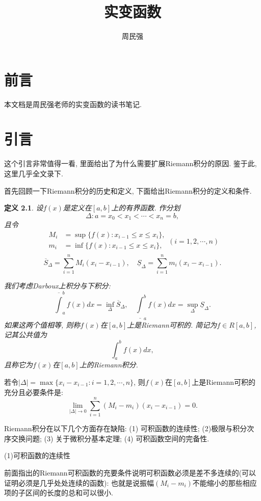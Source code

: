 \documentclass[12pt,a4paper,openany]{book}
\title{实变函数}
\author{周民强}
\newtheorem{definition}{定义}[section]
\begin{document}
\frontmatter
\frontmatter
\begin{titlepage}
\maketitle
\end{titlepage}
\setcounter{page}{0}
\chapter{前言}
本文档是周民强老师的实变函数的读书笔记.

\chapter{引言}
这个引言非常值得一看, 里面给出了为什么需要扩展Riemann积分的原因. 鉴于此, 这里几乎全文录下.

首先回顾一下Riemann积分的历史和定义, 下面给出Riemann积分的定义和条件.

\begin{definition}
设$f(x)$是定义在$[a, b]$上的有界函数. 作分划
$$
\Delta: a = x_0 < x_1 < \cdots < x_n = b,
$$
且令
$$
\left.
\begin{aligned}
M_i &= \sup\{f(x) : x_{i-1} \le x \le x_i \}, \\
m_i &= \inf\{f(x) : x_{i-1} \le x \le x_i \}, \\
\end{aligned}
\right.
(i=1,2,\cdots, n)
$$
$$
\overline{S}_{\Delta} = \sum_{i=1}^{n}{M_i(x_i - x_{i-1})}, \quad \underline{S}_{\Delta} = \sum_{i=1}^{n}{m_i(x_i - x_{i-1})}.
$$

我们考虑Darboux上积分与下积分:
$$
\overline{\int}_{a}^{b}{f(x)dx} = \inf_{\Delta}\overline{S}_{\Delta}, \quad \underline{\int}_{a}^{b}{f(x)dx} = \sup_{\Delta}\underline{S}_{\Delta}. 
$$
如果这两个值相等, 则称$f(x)$在$[a, b]$上是Riemann可积的. 简记为$f \in R[a, b]$, 记其公共值为
$$
\int_{a}^{b}{f(x)dx},
$$
且称它为$f(x)$在$[a, b]$上的Riemann积分.
\end{definition}

若令$|\Delta| = \max\{x_i - x_{i-1}: i = 1, 2, \cdots, n\}$, 则$f(x)$在$[a, b]$上是Riemann可积的充分且必要条件是:
$$
\lim_{|\Delta| \rightarrow 0}{\sum_{i=1}^{n}{(M_i - m_i)(x_i - x_{i-1})}} = 0.
$$

Riemann积分在以下几个方面存在缺陷: (1) 可积函数的连续性; (2)极限与积分次序交换问题; (3) 关于微积分基本定理; (4) 可积函数空间的完备性.

(1)可积函数的连续性

前面指出的Riemann可积函数的充要条件说明可积函数必须是差不多连续的(可以证明必须是几乎处处连续的函数): 也就是说振幅$(M_i - m_i)$不能缩小的那些相应项的子区间的长度的总和可以很小.
\end{document}
